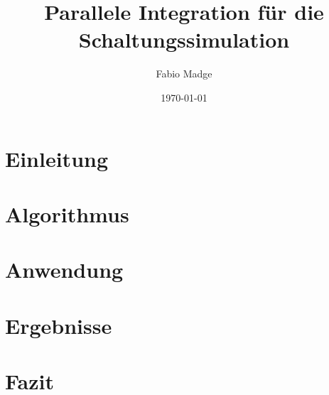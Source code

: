 \documentclass[12pt,a4paper]{article}
\title{Parallele Integration für die Schaltungssimulation}
\author{Fabio Madge}
\date{\today}
\begin{document}
\maketitle

\section{Einleitung}


\section{Algorithmus}


\section{Anwendung}


\section{Ergebnisse}


\section{Fazit}





\end{document}
